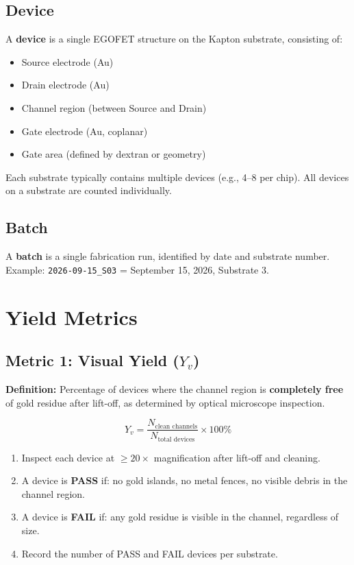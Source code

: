 \documentclass[11pt,a4paper]{article}
\begin{document}
\subsection{Device}

A \textbf{device} is a single EGOFET structure on the Kapton substrate,
consisting of:
\begin{itemize}
    \item Source electrode (Au)
    \item Drain electrode (Au)
    \item Channel region (between Source and Drain)
    \item Gate electrode (Au, coplanar)
    \item Gate area (defined by dextran or geometry)
\end{itemize}

Each substrate typically contains multiple devices (e.g., 4--8 per chip).
All devices on a substrate are counted individually.

\subsection{Batch}

A \textbf{batch} is a single fabrication run, identified by date and
substrate number. Example: \texttt{2026-09-15\_S03} = September 15, 2026,
Substrate 3.

\section{Yield Metrics}

\subsection{Metric 1: Visual Yield ($Y_v$)}

\textbf{Definition:} Percentage of devices where the channel region is
\textbf{completely free} of gold residue after lift-off, as determined
by optical microscope inspection.

\begin{equation}
    Y_v = \frac{N_{\text{clean channels}}}{N_{\text{total devices}}}
    \times 100\%
\end{equation}

\begin{tipbox}
\begin{enumerate}
    \item Inspect each device at $\geq 20\times$ magnification after
          lift-off and cleaning.
    \item A device is \textbf{PASS} if: no gold islands, no metal fences,
          no visible debris in the channel region.
    \item A device is \textbf{FAIL} if: any gold residue is visible in
          the channel, regardless of size.
    \item Record the number of PASS and FAIL devices per substrate.
\end{enumerate}
\end{tipbox}
\end{document}
